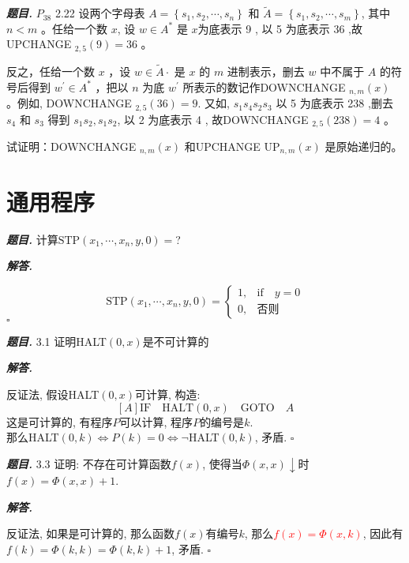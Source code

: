 \documentclass[10pt, a4paper, oneside]{ctexart}
\newenvironment{problem}{\begin{framed}\par\noindent\textbf{\textit{题目. }}}{\end{framed}\par}
\newenvironment{solution}{%
  \par\noindent\textbf{\textit{解答. }}\ignorespaces
}{%
  \hfill\ensuremath{\square}\par
}
\begin{document}
\begin{problem}
    $P_{38}$ 2.22 设两个字母表 $A=\left\{s_1, s_2, \cdots, s_n\right\}$ 和 $\tilde{A}=\left\{s_1, s_2, \cdots, s_m\right\}$, 其中 $n<m$ 。任给一个数 $x$, 设 $w \in A^*$ 是 $x$为底表示 9 , 以 5 为底表示 36 ,故UPCHANGE ${ }_{2,5}(9)=36$ 。

    反之，任给一个数 $x$ ，设 $w \in \tilde{A} \cdot$ 是 $x$ 的 $m$ 进制表示，删去 $w$ 中不属于 $A$ 的符号后得到 $w^{\prime} \in A^*$ ，把以 $n$ 为底 $w^{\prime}$ 所表示的数记作DOWNCHANGE ${ }_{n, m}(x)$ 。例如, DOWNCHANGE ${ }_{2,5}(36)=9$. 又如, $s_1 s_4 s_2 s_3$ 以 5 为底表示 238 ,删去 $s_4$ 和 $s_3$ 得到 $s_1 s_2, s_1 s_2$, 以 2 为底表示 4 , 故DOWNCHANGE ${ }_{2,5}(238)=4$ 。
    
    试证明：DOWNCHANGE ${ }_{n, m}(x)$ 和UPCHANGE $\mathrm{UP}_{n, m}(x)$ 是原始递归的。
\end{problem}

\section{通用程序}

\begin{problem}
计算$\text{STP}(x_1,\cdots,x_n,y,0)=$?
\end{problem}
\begin{solution}
    $$\text{STP}(x_1,\cdots,x_n,y,0)=\begin{cases}
        1, & \text{if}\quad y=0\\
        0, &\text{否则} 
    \end{cases}$$
\end{solution}

\begin{problem}
    3.1 证明HALT$(0,x)$是不可计算的
\end{problem}
\begin{solution}
反证法, 假设HALT$(0,x)$可计算, 构造:
$$[A] \text{IF} \quad  \text{HALT}(0,x) \quad \text{GOTO} \quad A $$
这是可计算的, 有程序$P$可以计算, 程序$P$的编号是$k$.\\
那么HALT$(0,k) \iff P(k)=0 \iff \neg $HALT$(0,k)$, 矛盾.
\end{solution}

\begin{problem}
    3.3 证明: 不存在可计算函数$f(x)$, 使得当$\Phi(x,x)\downarrow$时$f(x) = \Phi(x,x)+1$.
\end{problem}
\begin{solution}
    反证法, 如果是可计算的, 那么函数$f(x)$有编号$k$, 那么\textcolor{red}{$f(x)=\Phi(x,k)$}, 因此有$f(k)=\Phi(k,k)=\Phi(k,k)+1$, 矛盾.
\end{solution}
\end{document}
